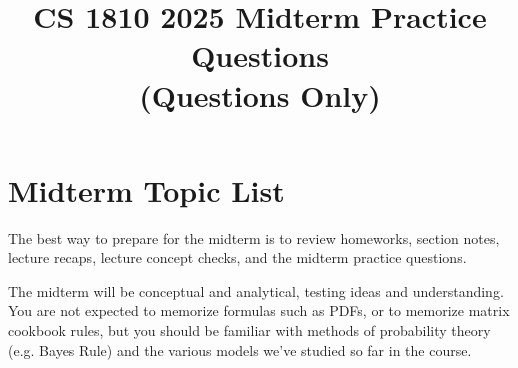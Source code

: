\documentclass{article}
\title{CS 1810 2025 Midterm Practice Questions\\ (Questions Only)}
\date{}
\begin{document}
\maketitle

\section*{Midterm Topic List}
The best way to prepare for the midterm is to review homeworks, section notes, lecture recaps, lecture concept checks, and the midterm practice questions.

The midterm will be conceptual and analytical, testing ideas and understanding. You are not expected to memorize formulas such as PDFs, or to memorize matrix cookbook rules, but you should be familiar with methods of probability theory (e.g. Bayes Rule) and the various models we’ve studied so far in the course.
\end{document}
